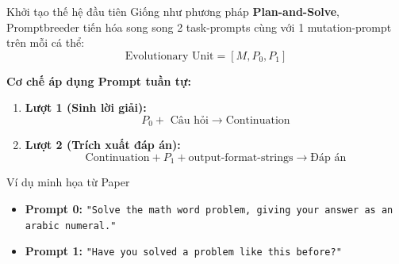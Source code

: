 \documentclass[english,main=vietnamese,xcolor=table]{beamer}
\begin{document}
\begin{frame}{Khởi tạo thế hệ đầu tiên}
Giống như phương pháp \textbf{Plan-and-Solve}, Promptbreeder tiến hóa song song 2 task-prompts cùng với 1 mutation-prompt trên mỗi cá thể:
\[
\text{Evolutionary Unit} = [M, P_0, P_1]
\]

\vspace{0.3em}
\textbf{Cơ chế áp dụng Prompt tuần tự:}
\begin{enumerate}
    \item \textbf{Lượt 1 (Sinh lời giải):} 
    \[ P_0 + \text{ Câu hỏi} \longrightarrow \text{Continuation} \]
    \item \textbf{Lượt 2 (Trích xuất đáp án):} 
    \[ \text{Continuation} + P_1 + \text{output-format-strings} \longrightarrow \text{Đáp án} \]
\end{enumerate}

\vspace{0.3em}

\begin{exampleblock}{Ví dụ minh họa từ Paper}
\begin{itemize}
    \item \textbf{Prompt 0:} {\color{red}\texttt{"Solve the math word problem, giving your answer as an arabic numeral."}}
    \item \textbf{Prompt 1:} {\color{red}\texttt{"Have you solved a problem like this before?"}}
\end{itemize}
\end{exampleblock}

\end{frame}

\end{document}
